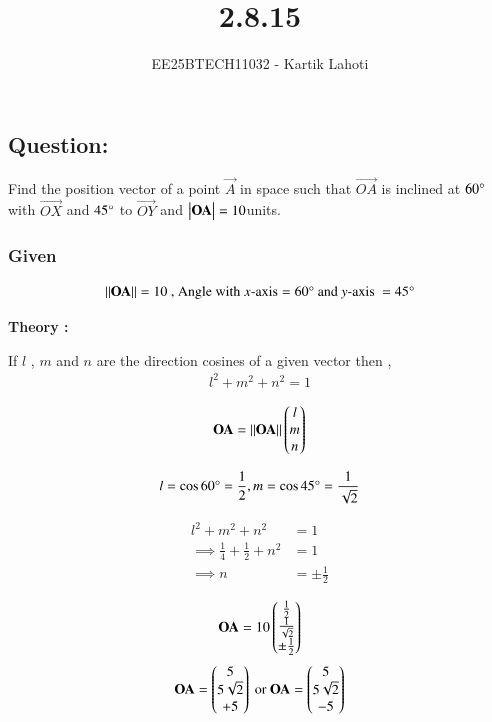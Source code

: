 \documentclass[journal]{IEEEtran}
\numberwithin{equation}{enumi}
\numberwithin{figure}{enumi}
\begin{document}

\vspace{3cm}

\title{2.8.15}
\author{EE25BTECH11032 - Kartik Lahoti}
\maketitle

\subsection*{Question: } 
Find the position vector of a point $\vec{A}$ in space such that $\vec{OA}$ is inclined at $60\degree$ with $\vec{OX}$ and $45\degree$ to $\vec{OY}$ and $\begin{vmatrix}\mathbf{OA}\end{vmatrix} = 10 $units.

\solution 

\subsubsection*{Given }

\begin{align}
    \left\lVert\mathbf{OA}\right\rVert = 10 \text{ , Angle with } x\text{-axis} = 60\degree \text{ and } y\text{-axis } = 45\degree
\end{align}

\textbf{Theory :}

If $l$ , $m$ and $n$ are the direction cosines of a given vector then , 
\begin{align}
    l^2 + m^2 + n^2 = 1 
\end{align}

\begin{align}
    \mathbf{OA} = \left\lVert\mathbf{OA}\right\rVert \begin{pmatrix}l \\ m \\ n\end{pmatrix}
\end{align}

\begin{align}
    l = \cos{60\degree} = \frac{1}{2} , m = \cos{45\degree} = \frac{1}{\sqrt{2}}
\end{align}

\begin{align}
    l^2 + m^2 + n^2 &= 1\\
    \implies \frac{1}{4} + \frac{1}{2} + n^2  &= 1\\
    \implies n &= \pm \frac{1}{2}
\end{align}

\begin{align}
    \mathbf{OA} = 10\begin{pmatrix}\frac{1}{2} \\ \frac{1}{\sqrt{2}} \\ \pm \frac{1}{2}\end{pmatrix}
\end{align}
\begin{align}
    \mathbf{OA} = \begin{pmatrix}5 \\ 5\sqrt{2} \\ +5\end{pmatrix} \text{ or } \mathbf{OA} = \begin{pmatrix}5 \\ 5\sqrt{2} \\ -5\end{pmatrix} 
\end{align}
\end{document}
